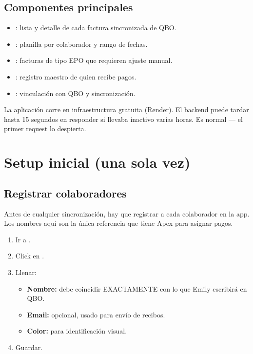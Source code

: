 \documentclass[11pt,a4paper]{article}
\begin{document}
\subsection{Componentes principales}

\begin{itemize}
  \item {}: lista y detalle de cada factura sincronizada de QBO.
  \item {}: planilla por colaborador y rango de fechas.
  \item {}: facturas de tipo EPO que requieren ajuste manual.
  \item {}: registro maestro de quien recibe pagos.
  \item {}: vinculación con QBO y sincronización.
\end{itemize}

\begin{infobox}
La aplicación corre en infraestructura gratuita (Render). El backend puede tardar hasta 15 segundos en responder si llevaba inactivo varias horas. Es normal --- el primer request lo despierta.
\end{infobox}

\section{Setup inicial (una sola vez)}

\subsection{Registrar colaboradores}

Antes de cualquier sincronización, hay que registrar a cada colaborador en la app. Los nombres aquí son la única referencia que tiene Apex para asignar pagos.

\begin{enumerate}
  \item Ir a .
  \item Click en .
  \item Llenar:
    \begin{itemize}
      \item \textbf{Nombre:} debe coincidir EXACTAMENTE con lo que Emily escribirá en QBO.
      \item \textbf{Email:} opcional, usado para envío de recibos.
      \item \textbf{Color:} para identificación visual.
    \end{itemize}
  \item Guardar.
\end{enumerate}
\end{document}

